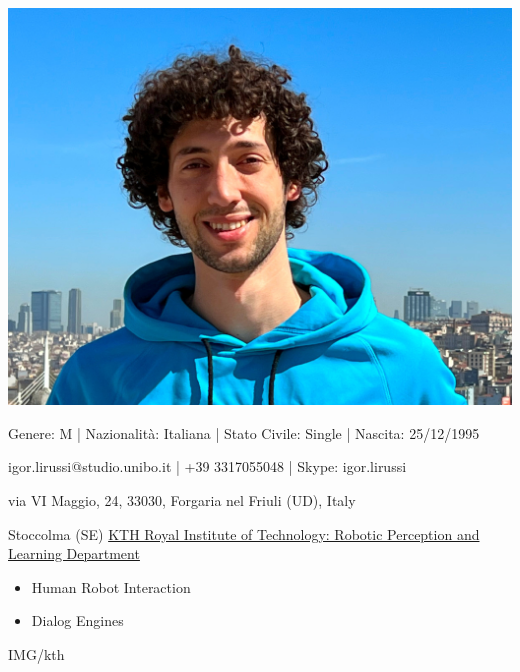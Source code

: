 \documentclass[paper=a4,fontsize=11pt]{temp} %
\begin{document}
\begin{minipage}{.2\linewidth}
   \includegraphics[width=1\textwidth]{photo}
\end{minipage}      
\begin{minipage}{0.7\linewidth}
   \sepspace
   \noindent
  \hfill Genere: M | Nazionalità: Italiana | Stato Civile: Single | Nascita: 25/12/1995
  
  \hfill igor.lirussi@studio.unibo.it | +39 3317055048 | Skype: igor.lirussi
   

   
   \hfill via VI Maggio, 24, 33030, Forgaria nel Friuli (UD), Italy
 

\end{minipage}



\noindent

{Stoccolma (SE) \href{https://www.kth.se/is/rpl}{KTH Royal Institute of Technology: Robotic Perception and Learning Department}}
{
 \begin{itemize}
    \item Human Robot Interaction
    \item Dialog Engines
 \end{itemize}
} {IMG/kth}

\sepspace
\end{document}
